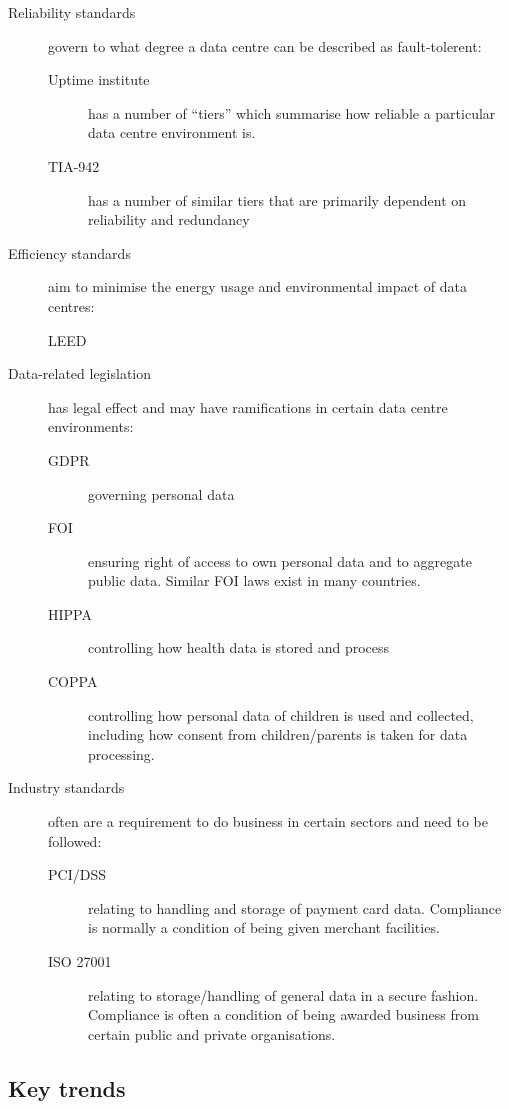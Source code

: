 \begin{description}
\item[Reliability standards] govern to what degree a data centre can be described as fault-tolerent:
  \begin{description}
  \item[Uptime institute] has a number of ``tiers'' which summarise how reliable a particular data centre environment is.
  \item[TIA-942] has a number of similar tiers that are primarily dependent on reliability and redundancy
  \end{description}
\item[Efficiency standards] aim to minimise the energy usage and environmental impact of data centres:
\begin{description}
\item[LEED]
\end{description}
\item[Data-related legislation] has legal effect and may have ramifications in certain data centre environments:
  \begin{description}
  \item[GDPR] governing personal data
  \item[FOI] ensuring right of access to own personal data and to aggregate public data. Similar FOI laws exist in many countries.
  \item[HIPPA] controlling how health data is stored and process
  \item[COPPA] controlling how personal data of children is used and collected, including how consent from children/parents is taken for data processing.
  \end{description}
\item[Industry standards] often are a requirement to do business in certain sectors and need to be followed:
  \begin{description}
  \item[PCI/DSS] relating to handling and storage of payment card data. Compliance is normally a condition of being given merchant facilities.
  \item[ISO 27001] relating to storage/handling of general data in a secure fashion.  Compliance is often a condition of being awarded business from certain public and private organisations.
  \end{description}
\end{description}


\subsection{Key trends}

